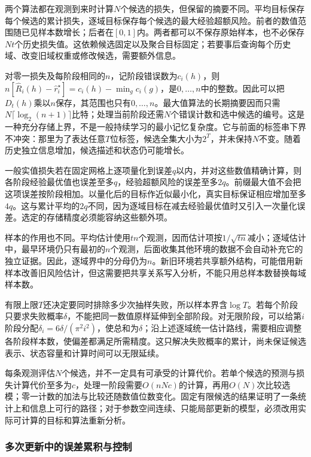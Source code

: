 两个算法都在观测到来时计算$N$个候选的损失，但保留的摘要不同。平均目标保存每个候选的累计损失，逐域目标保存每个候选的最大经验超额风险。前者的数值范围随已见样本数增长；后者在$[0,1]$内。两者都可以不保存原始样本，也不必保存$Nt$个历史损失值。这依赖候选固定以及聚合目标固定；若要事后查询每个历史域、改变旧域权重或修改候选，需要额外信息。

对零一损失及每阶段相同的$n$，记阶段错误数为$c_i(h)$，则$n[\widehat R_i(h)-\widehat r_i^\star]=c_i(h)-\min_g c_i(g)$，是$0,\ldots,n$中的整数。因此可以把$D_t(h)$乘以$n$保存，其范围也只有$0,\ldots,n$。最大值算法的长期摘要因而只需$N\lceil\log_2(n+1)\rceil$比特；处理当前阶段还需$N$个错误计数和选中候选的编号。这是一种充分存储上界，不是一般持续学习的最小记忆复杂度。它与前面的标签串下界不冲突：那里为了表达任意$T$位标签，候选全集大小为$2^T$，并未保持$N$不变。随着历史独立信息增加，候选描述和状态仍可能增长。

一般实值损失若在固定网格上逐项量化到误差$q$以内，并对这些数值精确计算，则各阶段经验最优值也误差至多$q$，经验超额风险的误差至多$2q$。前缀最大值不会把这项误差按阶段相加。以量化后的目标作近似最小化，真实目标保证相应增加至多$4q$。这与累计平均的$2q$不同，因为逐域目标在减去经验最优值时又引入一次量化误差。选定的存储精度必须能容纳这些额外项。

样本的作用也不同。平均估计使用$tn$个观测，因而估计项按$1/\sqrt{tn}$减小；逐域估计中，最早环境仍只有最初的$n$个观测，后面收集其他环境的数据不会自动补充它的独立证据。因此，逐域界中的分母仍为$n$。新旧环境若共享额外结构，可能借用新样本改善旧风险估计，但这需要把共享关系写入分析，不能只用总样本数替换每域样本数。

有限上限$T$还决定要同时排除多少次抽样失败，所以样本界含$\log T$。若每个阶段只要求失败概率$\delta$，不能把同一数值原样延伸到全部阶段。对无限阶段，可以给第$i$阶段分配$\delta_i=6\delta/(\pi^2i^2)$，使总和为$\delta$；沿上述逐域统一估计路线，需要相应调整各阶段样本数，使偏差都满足所需精度。这只解决失败概率的累计，尚未保证候选表示、状态容量和计算时间可以无限延续。

每条观测评估$N$个候选，并不一定具有可承受的计算代价。若单个候选的预测与损失计算代价至多为$c$，处理一阶段需要$O(nNc)$的计算，再用$O(N)$次比较选模；零一计数的加法与比较还随数值位数变化。固定有限候选的结果证明了一条统计上和信息上可行的路径；对于参数空间连续、只能局部更新的模型，必须改用实际可计算的目标和算法重新分析。

\subsubsection{多次更新中的误差累积与控制}

